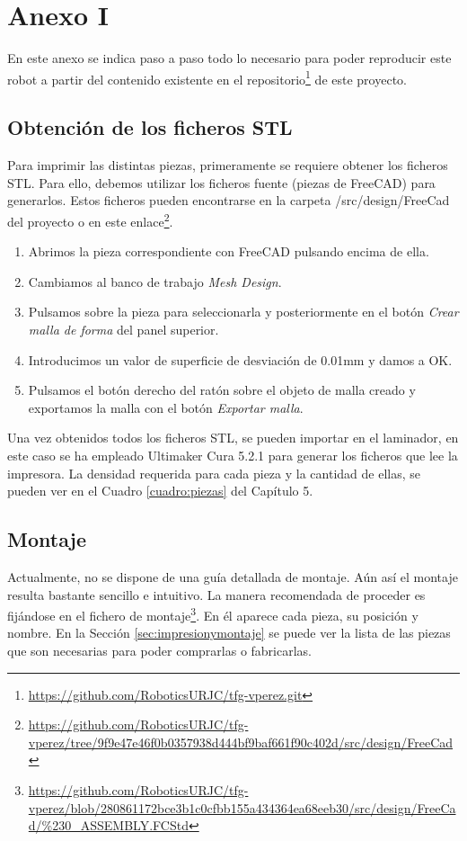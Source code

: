 \chapter*{Anexo I}
\label{cap:anexoi}

\noindent En este anexo se indica paso a paso todo lo necesario para poder reproducir este robot a partir del contenido 
existente en el repositorio\footnote{\url{https://github.com/RoboticsURJC/tfg-vperez.git}} de este proyecto.

\section*{Obtención de los ficheros STL}
\noindent Para imprimir las distintas piezas, primeramente se requiere obtener los ficheros STL. Para ello, 
debemos utilizar los ficheros fuente (piezas de FreeCAD) para generarlos. Estos ficheros pueden 
encontrarse en la carpeta /src/design/FreeCad del proyecto o en este enlace\footnote{\url{https://github.com/RoboticsURJC/tfg-vperez/tree/9f9e47e46f0b0357938d444bf9baf661f90c402d/src/design/FreeCad}}.
\begin{enumerate}
\item Abrimos la pieza correspondiente con FreeCAD pulsando encima de ella.
\item Cambiamos al banco de trabajo \textit{Mesh Design}.
\item Pulsamos sobre la pieza para seleccionarla y posteriormente en el botón \textit{Crear malla de forma} del panel superior.
\item Introducimos un valor de superficie de desviación de 0.01mm y damos a OK.
\item Pulsamos el botón derecho del ratón sobre el objeto de malla creado y exportamos la malla con el botón \textit{Exportar malla}. 
    
\end{enumerate}

Una vez obtenidos todos los ficheros STL, se pueden importar en el laminador, en este caso se ha empleado 
Ultimaker Cura 5.2.1 para generar los ficheros que lee la impresora. La densidad requerida para cada pieza 
y la cantidad de ellas, se pueden ver en el Cuadro \ref{cuadro:piezas} del Capítulo 5.

\newpage
\section*{Montaje}
\noindent Actualmente, no se dispone de una guía detallada de montaje. Aún así el montaje resulta bastante sencillo 
e intuitivo. La manera recomendada de proceder es fijándose en el fichero de 
montaje\footnote{\url{https://github.com/RoboticsURJC/tfg-vperez/blob/280861172bce3b1c0cfbb155a434364ea68eeb30/src/design/FreeCad/\%230\_ASSEMBLY.FCStd}}. En él 
aparece cada pieza, su posición y nombre. En la Sección \ref{sec:impresionymontaje} se puede ver la lista de las piezas que 
son necesarias para poder comprarlas o fabricarlas.

